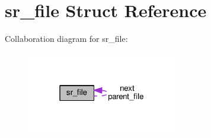 \hypertarget{structsr__file}{}\section{sr\+\_\+file Struct Reference}
\label{structsr__file}


Collaboration diagram for sr\+\_\+file\+:\nopagebreak
\begin{figure}[H]
\begin{center}
\leavevmode
\includegraphics[width=187pt]{structsr__file__coll__graph}
\end{center}
\end{figure}

